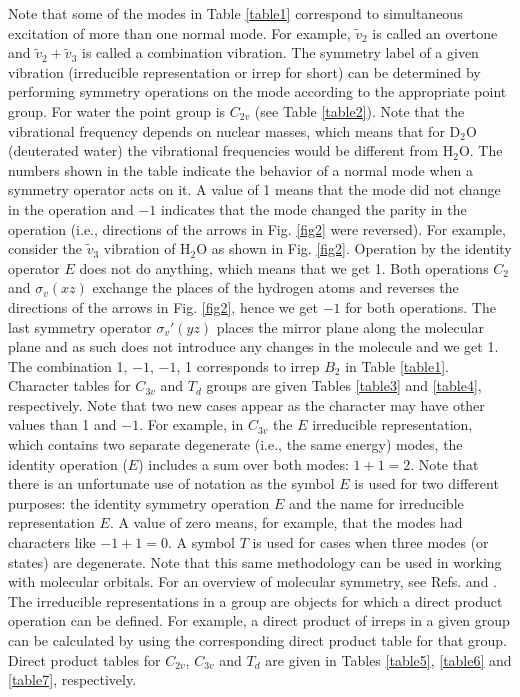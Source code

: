 \documentclass[byrevtex,amssymb,aps,pra,floatfix,letterpaper]{revtex4}
\begin{document}
\noindent
Note that some of the modes in Table \ref{table1} correspond to simultaneous excitation of more than one normal mode. For example, $\tilde{v}_2$ is called an overtone and $\tilde{v}_2 + \tilde{v}_3$ is called a combination vibration. The symmetry label of a given vibration (irreducible representation or irrep for short) can be determined by performing symmetry operations on the mode according to the appropriate point group. For water the point group is $C_{2v}$ (see Table \ref{table2}). Note that the vibrational frequency depends on nuclear masses, which means that for D$_2$O (deuterated water) the vibrational frequencies would be different from H$_2$O. The numbers shown in the table indicate the behavior of a normal mode when a symmetry operator acts on it. A value of 1 means that the mode did not change in the operation and $-1$ indicates that the mode changed the parity in the operation (i.e., directions of the arrows in Fig. \ref{fig2} were reversed). For example, consider the $\tilde{v}_3$ vibration of H$_2$O as shown in Fig. \ref{fig2}. Operation by the identity operator $E$ does not do anything, which means that we get 1. Both operations $C_2$ and $\sigma_{v}(xz)$ exchange the places of the hydrogen atoms and reverses the directions of the arrows in Fig. \ref{fig2}, hence we get $-1$ for both operations. The last symmetry operator $\sigma_{v}'(yz)$ places the mirror plane along the molecular plane and as such does not introduce any changes in the molecule and we get 1. The combination 1, $-1$, $-1$, 1 corresponds to irrep $B_2$ in Table \ref{table1}. Character tables for $C_{3v}$ and $T_d$ groups are given Tables \ref{table3} and \ref{table4}, respectively. Note that two new cases appear as the character may have other values than 1 and $-1$. For example, in $C_{3v}$ the $E$ irreducible representation, which contains two separate degenerate (i.e., the same energy) modes, the identity operation ($E$) includes a sum over both modes: $1 + 1 = 2$. Note that there is an unfortunate use of notation as the symbol $E$ is used for two different purposes: the identity symmetry operation $E$ and the name for irreducible representation $E$. A value of zero means, for example, that the modes had characters like $-1 + 1 = 0$. A symbol $T$ is used for cases
when three modes (or states) are degenerate. Note that this same methodology can be used in working with molecular orbitals. For an overview of molecular symmetry, see Refs. \cite{SILBEY} and \cite{ATKINS1}. The irreducible representations in a group are objects for which a direct product operation can be defined. For example, a direct product of irreps in a given group can be calculated by using the corresponding direct product table for that group. Direct product tables for $C_{2v}$, $C_{3v}$ and $T_d$ are given in Tables \ref{table5}, \ref{table6} and \ref{table7}, respectively. 
\end{document}
